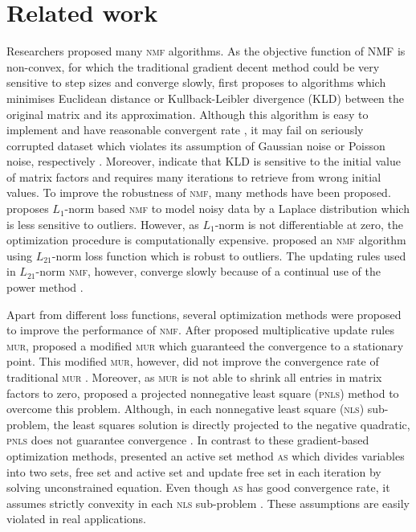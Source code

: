 \section{Related work}
Researchers proposed many \textsc{nmf} algorithms. As the objective function of \textsc{NMF} is non-convex, for which the traditional gradient decent method could be very sensitive to step sizes and converge slowly, \citet{lee2001algorithms} first proposes to algorithms which minimises Euclidean distance or Kullback-Leibler divergence (\textsc{KLD}) between the original matrix and its approximation. Although this algorithm is easy to implement and have reasonable convergent rate \citep{lee2001algorithms}, it may fail on seriously corrupted dataset which violates its assumption of Gaussian noise or Poisson noise, respectively \citep{guan2017truncated}. Moreover, \citet{yang2011kullback} indicate that \textsc{KLD} is sensitive to the initial value of matrix factors and requires many iterations to retrieve from wrong initial values.  To improve the robustness of \textsc{nmf}, many methods have been proposed. \citet{lam2008non} proposes ${L_1}$-norm based \textsc{nmf} to model noisy data by a Laplace distribution which is less sensitive to outliers. However, as $L_1$-norm is not differentiable at zero, the optimization procedure is computationally expensive. \citet{kong2011robust} proposed an \textsc{nmf} algorithm using $L_{21}$-norm loss function which is robust to outliers. The updating rules used in $L_{21}$-norm \textsc{nmf}, however, converge slowly because of a continual use of the power method \citep{guan2017truncated}.

Apart from different loss functions, several optimization methods were proposed to improve the performance of \textsc{nmf}. After \citet{lee2001algorithms} proposed  multiplicative update rules \textsc{mur}, \citet{ lin2007convergence} proposed a modified \textsc{mur} which guaranteed the convergence to a stationary point. This modified \textsc{mur}, however, did not improve the convergence rate of traditional \textsc{mur} \citep{guan2012nenmf}. Moreover, as \textsc{mur} is not able to shrink all entries in matrix factors to zero, \citet{berry2007algorithms} proposed a projected nonnegative least square (\textsc{pnls}) method to overcome this problem. Although, in each nonnegative least square (\textsc{nls}) sub-problem, the least squares solution is directly projected to the negative quadratic, \textsc{pnls} does not guarantee convergence \citep{guan2012nenmf}. In contrast to these gradient-based optimization methods, \citet{kim2008nonnegative} presented an active set method \textsc{as} which divides variables into two sets, free set and active set and update free set in each iteration by solving unconstrained equation. Even though \textsc{as} has good convergence rate, it assumes strictly convexity in each \textsc{nls} sub-problem \citep{kim2008nonnegative}. These assumptions are easily violated in real applications.
